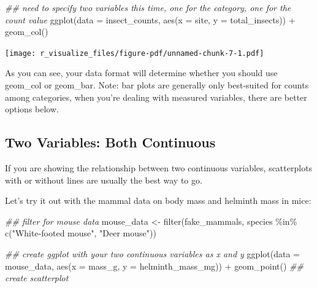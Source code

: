 \documentclass[
  letterpaper,
  DIV=11,
  numbers=noendperiod]{scrreprt}
\newenvironment{Shaded}{\begin{snugshade}}{\end{snugshade}}
\newcommand{\AttributeTok}[1]{\textcolor[rgb]{0.40,0.45,0.13}{#1}}
\newcommand{\DocumentationTok}[1]{\textcolor[rgb]{0.37,0.37,0.37}{\textit{#1}}}
\newcommand{\FunctionTok}[1]{\textcolor[rgb]{0.28,0.35,0.67}{#1}}
\newcommand{\NormalTok}[1]{\textcolor[rgb]{0.00,0.23,0.31}{#1}}
\newcommand{\OtherTok}[1]{\textcolor[rgb]{0.00,0.23,0.31}{#1}}
\newcommand{\SpecialCharTok}[1]{\textcolor[rgb]{0.37,0.37,0.37}{#1}}
\newcommand{\StringTok}[1]{\textcolor[rgb]{0.13,0.47,0.30}{#1}}
\begin{document}
\begin{Shaded}
\begin{Highlighting}[]
\DocumentationTok{\#\# need to specify two variables this time, one for the category, one for the count value}
\FunctionTok{ggplot}\NormalTok{(}\AttributeTok{data =}\NormalTok{ insect\_counts, }\FunctionTok{aes}\NormalTok{(}\AttributeTok{x =}\NormalTok{ site, }\AttributeTok{y =}\NormalTok{ total\_insects)) }\SpecialCharTok{+}
  \FunctionTok{geom\_col}\NormalTok{()}
\end{Highlighting}
\end{Shaded}

\texttt{[image: r\_visualize\_files/figure-pdf/unnamed-chunk-7-1.pdf]}

As you can see, your data format will determine whether you should use
geom\_col or geom\_bar. Note: bar plots are generally only best-suited
for counts among categories, when you're dealing with measured
variables, there are better options below.

\subsection{Two Variables: Both
Continuous}\label{two-variables-both-continuous}

If you are showing the relationship between two continuous variables,
scatterplots with or without lines are usually the best way to go.

Let's try it out with the mammal data on body mass and helminth mass in
mice:

\begin{Shaded}
\begin{Highlighting}[]
\DocumentationTok{\#\# filter for mouse data}
\NormalTok{mouse\_data }\OtherTok{\textless{}{-}} \FunctionTok{filter}\NormalTok{(fake\_mammals, species }\SpecialCharTok{\%in\%} \FunctionTok{c}\NormalTok{(}\StringTok{"White{-}footed mouse"}\NormalTok{, }\StringTok{"Deer mouse"}\NormalTok{))}

\DocumentationTok{\#\# create ggplot with your two continuous variables as x and y}
\FunctionTok{ggplot}\NormalTok{(}\AttributeTok{data =}\NormalTok{ mouse\_data, }\FunctionTok{aes}\NormalTok{(}\AttributeTok{x =}\NormalTok{ mass\_g, }\AttributeTok{y =}\NormalTok{ helminth\_mass\_mg)) }\SpecialCharTok{+}
  \FunctionTok{geom\_point}\NormalTok{() }\DocumentationTok{\#\# create scatterplot}
\end{Highlighting}
\end{Shaded}
\end{document}
